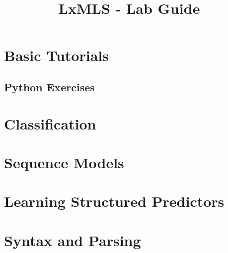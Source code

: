 \documentclass{report}
\begin{document}
\title{LxMLS - Lab Guide}

\maketitle

\renewcommand{\chaptername}{Day}
\setcounter{chapter}{-1}

\chapter{Basic Tutorials}



%

\section{Python Exercises}







\chapter{\label{day:classification}Classification}



\chapter{\label{day:seq}Sequence Models}


\chapter{\label{day:seq_disc}Learning Structured Predictors}


\chapter{Syntax and Parsing}


%



% 
% 


%


\end{document}
